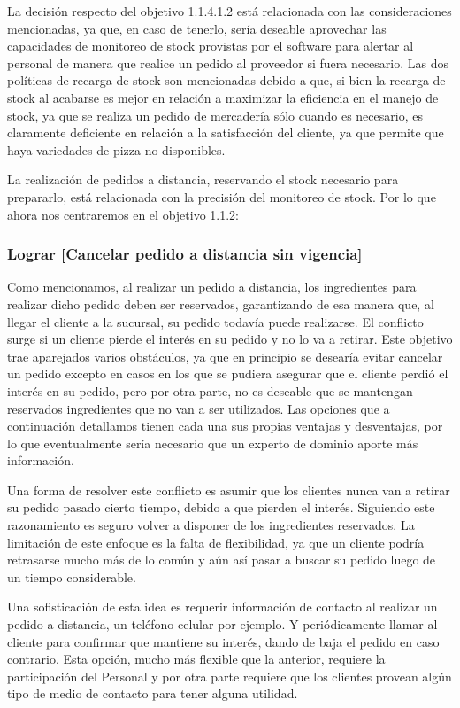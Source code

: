 \documentclass[a4paper,10pt]{article}
\begin{document}
La decisión respecto del objetivo 1.1.4.1.2 está relacionada con las consideraciones mencionadas, ya que, en caso de tenerlo, sería deseable aprovechar las capacidades de monitoreo de stock provistas por el software para alertar al personal de manera que realice un pedido al proveedor si fuera necesario. Las dos políticas de recarga de stock son mencionadas debido a que, si bien la recarga de stock al acabarse es mejor en relación a maximizar la eficiencia en el manejo de stock, ya que se realiza un pedido de mercadería sólo cuando es necesario, es claramente deficiente en relación a la satisfacción del cliente, ya que permite que haya variedades de pizza no disponibles.


La realización de pedidos a distancia, reservando el stock necesario para prepararlo, está relacionada con la precisión del monitoreo de stock. Por lo que ahora nos centraremos en el objetivo 1.1.2:
\subsubsection*{Lograr [Cancelar pedido a distancia sin vigencia]}
Como mencionamos, al realizar un pedido a distancia, los ingredientes para realizar dicho pedido deben ser reservados, garantizando de esa manera que, al llegar el cliente a la sucursal, su pedido todavía puede realizarse. El conflicto surge si un cliente pierde el interés en su pedido y no lo va a retirar.
Este objetivo trae aparejados varios obstáculos, ya que en principio se desearía evitar cancelar un pedido excepto en casos en los que se pudiera asegurar que el cliente perdió el interés en su pedido, pero por otra parte, no es deseable que se mantengan reservados ingredientes que no van a ser utilizados.
Las opciones que a continuación detallamos tienen cada una sus propias ventajas y desventajas, por lo que eventualmente sería necesario que un experto de dominio aporte más información.


Una forma de resolver este conflicto es asumir que los clientes nunca van a retirar su pedido pasado cierto tiempo, debido a que pierden el interés. Siguiendo este razonamiento es seguro volver a disponer de los ingredientes reservados. La limitación de este enfoque es la falta de flexibilidad, ya que un cliente podría retrasarse mucho más de lo común y aún así pasar a buscar su pedido luego de un tiempo considerable.

Una sofisticación de esta idea es requerir información de contacto al realizar un pedido a distancia, un teléfono celular por ejemplo. Y periódicamente llamar al cliente para confirmar que mantiene su interés, dando de baja el pedido en caso contrario. Esta opción, mucho más flexible que la anterior, requiere la participación del Personal y por otra parte requiere que los clientes provean algún tipo de medio de contacto para tener alguna utilidad.
\end{document}

